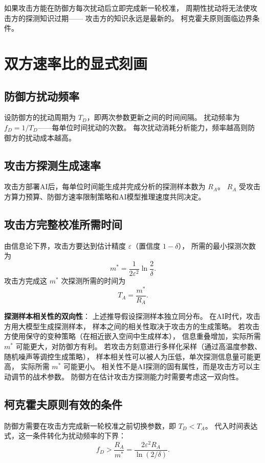 \documentclass[11pt,a4paper]{article}
\begin{document}
如果攻击方能在防御方每次扰动后立即完成新一轮校准，
周期性扰动将无法使攻击方的探测知识过期——
攻击方的知识永远是最新的。
柯克霍夫原则面临边界条件。

\section{双方速率比的显式刻画}

\subsection{防御方扰动频率}

设防御方的扰动周期为 \(T_D\)，即两次参数更新之间的时间间隔。
扰动频率为 \(f_D = 1/T_D\)——每单位时间扰动的次数。
每次扰动消耗分析能力，频率越高则防御方的扰动成本越高。

\subsection{攻击方探测生成速率}

攻击方部署AI后，每单位时间能生成并完成分析的探测样本数为 \(R_A\)。
\(R_A\) 受攻击方算力预算、防御方速率限制策略和AI模型推理速度共同决定。

\subsection{攻击方完整校准所需时间}

由信息论下界，攻击方要达到估计精度 \(\varepsilon\)（置信度 \(1 - \delta\)），
所需的最小探测次数为
\[
m^* = \frac{1}{2\varepsilon^2} \ln\frac{2}{\delta}.
\]
攻击方完成这 \(m^*\) 次探测所需的时间为
\[
T_A = \frac{m^*}{R_A}.
\]

\textbf{探测样本相关性的双向性}：
上述推导假设探测样本独立同分布。
在AI时代，攻击方用大模型生成探测样本，
样本之间的相关性取决于攻击方的生成策略。
若攻击方使用保守的变种策略（在相近嵌入空间中生成样本），
信息重叠增加，实际所需 \(m^*\) 可能更大，对防御方有利。
若攻击方刻意进行多样化采样（通过高温度参数、随机噪声等调控生成策略），
样本相关性可以被人为压低，单次探测信息量可能更高，
实际所需 \(m^*\) 可能更小。
相关性不是AI探测的固有属性，而是攻击方可以主动调节的战术参数。
防御方在估计攻击方探测能力时需要考虑这一双向性。

\subsection{柯克霍夫原则有效的条件}

防御方需要在攻击方完成新一轮校准之前切换参数，即 \(T_D < T_A\)。
代入时间表达式，这一条件转化为扰动频率的下界：
\[
f_D > \frac{R_A}{m^*} = \frac{2\varepsilon^2 R_A}{\ln(2/\delta)}.
\]
\end{document}
